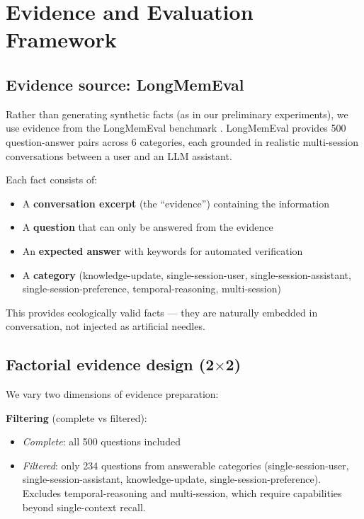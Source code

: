 \section{Evidence and Evaluation Framework}
\label{sec:framework}

\subsection{Evidence source: LongMemEval}
\label{sec:longmemeval}

Rather than generating synthetic facts (as in our preliminary experiments),
we use evidence from the LongMemEval benchmark \citep{wu2024longmemeval}. LongMemEval
provides 500 question-answer pairs across 6 categories, each grounded in
realistic multi-session conversations between a user and an LLM assistant.

Each fact consists of:
\begin{itemize}
  \item A \textbf{conversation excerpt} (the ``evidence'') containing the information
  \item A \textbf{question} that can only be answered from the evidence
  \item An \textbf{expected answer} with keywords for automated verification
  \item A \textbf{category} (knowledge-update, single-session-user, single-session-assistant,
    single-session-preference, temporal-reasoning, multi-session)
\end{itemize}

This provides ecologically valid facts --- they are naturally embedded in
conversation, not injected as artificial needles.

\subsection{Factorial evidence design (2$\times$2)}
\label{sec:factorial}

We vary two dimensions of evidence preparation:

\textbf{Filtering} (complete vs filtered):
\begin{itemize}
  \item \textit{Complete}: all 500 questions included
  \item \textit{Filtered}: only 234 questions from answerable categories (single-session-user,
    single-session-assistant, knowledge-update, single-session-preference).
    Excludes temporal-reasoning and multi-session, which require capabilities
    beyond single-context recall.
\end{itemize}

